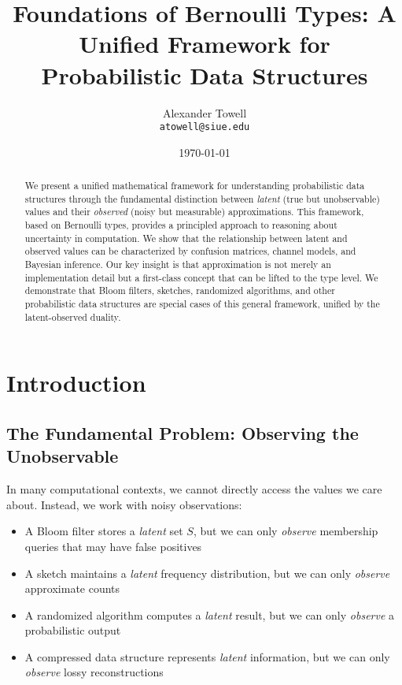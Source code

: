 \documentclass[11pt,final,hidelinks]{article}
\title{Foundations of Bernoulli Types: A Unified Framework for Probabilistic Data Structures}
\author{
    Alexander Towell\\
    \texttt{atowell@siue.edu}
}
\date{\today}
\begin{document}
\maketitle

\begin{abstract}
We present a unified mathematical framework for understanding probabilistic data structures through the fundamental distinction between \emph{latent} (true but unobservable) values and their \emph{observed} (noisy but measurable) approximations. This framework, based on Bernoulli types, provides a principled approach to reasoning about uncertainty in computation. We show that the relationship between latent and observed values can be characterized by confusion matrices, channel models, and Bayesian inference. Our key insight is that approximation is not merely an implementation detail but a first-class concept that can be lifted to the type level. We demonstrate that Bloom filters, sketches, randomized algorithms, and other probabilistic data structures are special cases of this general framework, unified by the latent-observed duality.
\end{abstract}

\section{Introduction}

\subsection{The Fundamental Problem: Observing the Unobservable}

In many computational contexts, we cannot directly access the values we care about. Instead, we work with noisy observations:

\begin{itemize}
    \item A Bloom filter stores a \emph{latent} set $S$, but we can only \emph{observe} membership queries that may have false positives
    \item A sketch maintains a \emph{latent} frequency distribution, but we can only \emph{observe} approximate counts
    \item A randomized algorithm computes a \emph{latent} result, but we can only \emph{observe} a probabilistic output
    \item A compressed data structure represents \emph{latent} information, but we can only \emph{observe} lossy reconstructions
\end{itemize}
\end{document}
